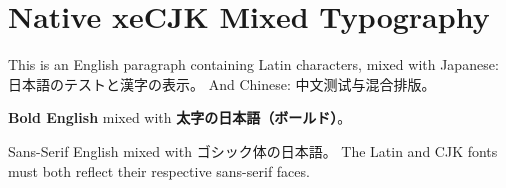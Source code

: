 \documentclass{article}
\begin{document}
\section{\sffamily Native xeCJK Mixed Typography}

This is an English paragraph containing Latin characters, mixed with Japanese: 日本語のテストと漢字の表示。
And Chinese: {\chinesefont 中文测试与混合排版。}

\textbf{Bold English} mixed with \textbf{太字の日本語（ボールド）}。

{\sffamily
Sans-Serif English mixed with ゴシック体の日本語。
The Latin and CJK fonts must both reflect their respective sans-serif faces.
}
\end{document}
